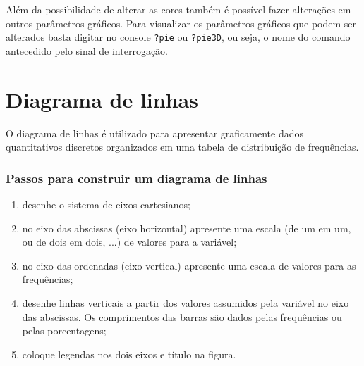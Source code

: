 \documentclass[11pt,fleqn]{book} %
\begin{document}
Além da possibilidade de alterar as cores também é possível fazer alterações em outros parâmetros gráficos. Para visualizar os parâmetros gráficos que podem ser alterados basta digitar no console \texttt{?pie} ou \texttt{?pie3D}, ou seja, o nome do comando antecedido pelo sinal de interrogação.




\section{Diagrama de linhas}


O diagrama de linhas é utilizado para apresentar graficamente dados quantitativos discretos organizados em uma tabela de distribuição de frequências. 

\subsubsection{Passos para construir um diagrama de linhas}

\begin{enumerate}
	\item desenhe o sistema de eixos cartesianos;
	
	\item no eixo das abscissas (eixo horizontal) apresente uma escala (de um em um, ou de dois em dois, ...) de valores para a variável;
	
	\item no eixo das ordenadas (eixo vertical) apresente uma escala de valores para as frequências;
	
	\item desenhe linhas verticais a partir dos valores assumidos pela variável no eixo das abscissas. Os comprimentos das barras são dados pelas frequências ou pelas porcentagens;
	
	\item coloque legendas nos dois eixos e título na figura. \\ \\
\end{enumerate}
\end{document}
